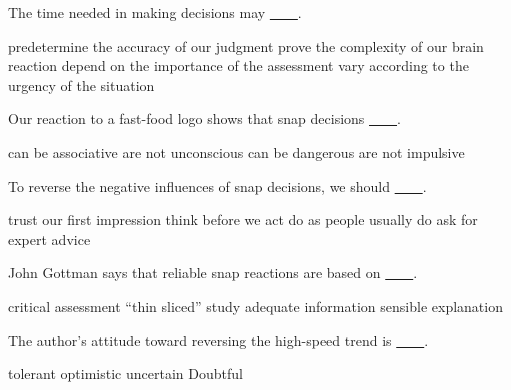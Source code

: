 \item The time needed in making decisions may \uline{~~~~}.
\begin{tasks}
	\task predetermine the accuracy of our judgment
	\task prove the complexity of our brain reaction
	\task depend on the importance of the assessment
	\task vary according to the urgency of the situation
\end{tasks}
\item Our reaction to a fast-food logo shows that snap decisions \uline{~~~~}.
\begin{tasks}
	\task can be associative
	\task are not unconscious
	\task can be dangerous
	\task are not impulsive
\end{tasks}
\item To reverse the negative influences of snap decisions, we should \uline{~~~~}.
\begin{tasks}
	\task trust our first impression
	\task think before we act
	\task do as people usually do
	\task ask for expert advice
\end{tasks}
\item John Gottman says that reliable snap reactions are based on \uline{~~~~}.
\begin{tasks}
	\task critical assessment
	\task ``thin sliced'' study
	\task adequate information
	\task sensible explanation
\end{tasks}
\item The author's attitude toward reversing the high-speed trend is \uline{~~~~}.
\begin{tasks}
	\task tolerant
	\task optimistic
	\task uncertain
	\task Doubtful
\end{tasks}